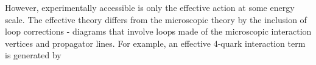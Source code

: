 {\begin{minipage}{\linewidth}
{\begin{minipage}{0.29\linewidth}
{
        }
    \end{minipage}
    }
\end{minipage}
}
However, experimentally accessible is only the effective action at some energy scale. The effective theory differs from the microscopic theory by the inclusion of loop corrections - diagrams that involve loops made of the microscopic interaction vertices and propagator lines. For example, an effective 4-quark interaction term is generated by
